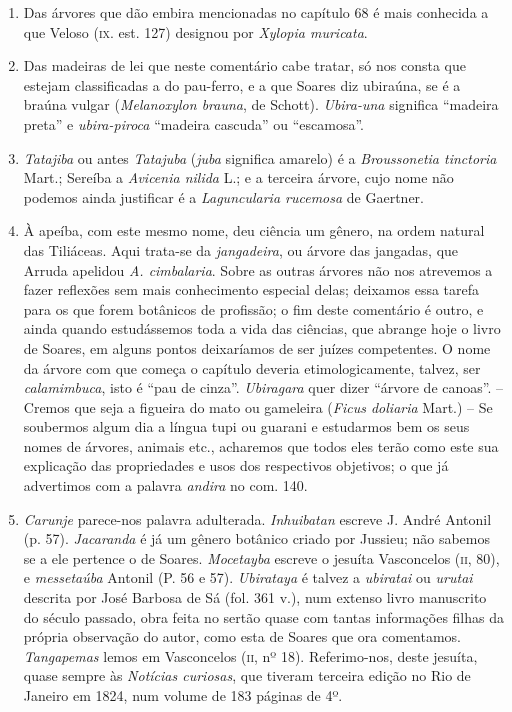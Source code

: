 \begin{enumerate}
\item  Das árvores que dão embira mencionadas no capítulo 68 é mais conhecida a que 
Veloso (\textsc{ix}. est. 127) designou por \textit{Xylopia muricata}.

\item Das madeiras de lei que neste comentário cabe tratar, só nos consta que estejam 
classificadas a do pau-ferro, e a que Soares diz ubiraúna, se é a braúna vulgar  
(\textit{Melanoxylon brauna}, de Schott). \textit{Ubira-una} significa ``madeira  preta''  e 
\textit{ubira-piroca} ``madeira cascuda'' ou ``escamosa''. 

\item \textit{Tatajiba} ou antes \textit{Tatajuba} (\textit{juba} significa amarelo) é a \textit{Broussonetia tinctoria} 
Mart.; Sereíba a \textit{Avicenia nilida} L.; e a terceira árvore, cujo nome não podemos 
ainda justificar é a \textit{Laguncularia rucemosa} de Gaertner.

\item À apeíba, com este mesmo nome, deu ciência um gênero, na ordem natural das  Tiliáceas. 
Aqui trata-se da \textit{jangadeira}, ou árvore das jangadas, que Arruda apelidou \textit{A. cimbalaria}. 
Sobre as outras árvores não nos atrevemos a fazer reflexões sem mais 
conhecimento especial delas; deixamos essa tarefa para os que forem botânicos de 
profissão; o fim deste comentário é outro, e ainda quando estudássemos toda a vida das 
ciências, que abrange hoje o livro de Soares, em alguns pontos deixaríamos de ser 
juízes competentes. O nome da árvore com que começa o capítulo deveria 
etimologicamente, talvez, ser \textit{calamimbuca}, isto é ``pau de cinza''. 
\textit{Ubiragara} quer dizer ``árvore de canoas''.  -- Cremos que seja a figueira do mato ou 
gameleira (\textit{Ficus doliaria} Mart.) -- Se soubermos algum dia a língua tupi ou guarani e 
estudarmos bem os seus nomes de árvores, animais etc., acharemos que todos eles terão 
como este sua explicação das propriedades e usos dos respectivos objetivos; o que já 
advertimos com a palavra \textit{andira} no com. 140.

\item  \textit{Carunje} parece-nos palavra adulterada. \textit{Inhuibatan} escreve J. André
Antonil (p. 57). \textit{Jacaranda} é já um gênero botânico criado por Jussieu; não
sabemos se a ele pertence o de Soares. \textit{Mocetayba} escreve o jesuíta Vasconcelos
(\textsc{ii}, 80), e \textit{messetaúba} Antonil (P. 56 e 57). \textit{Ubirataya} é talvez 
a \textit{ubiratai} ou \textit{urutai} descrita por José Barbosa de Sá (fol. 361 v.), num extenso livro 
manuscrito do século passado, obra feita no sertão quase com tantas informações filhas 
da própria observação do autor, como esta de Soares que ora comentamos. \textit{Tangapemas} 
lemos em Vasconcelos (\textsc{ii}, nº 18). Referimo-nos, deste jesuíta, quase sempre às  
\textit{Notícias curiosas}, que tiveram terceira edição no Rio de Janeiro em 1824, num volume 
de 183 páginas de 4º.


\end{enumerate}
